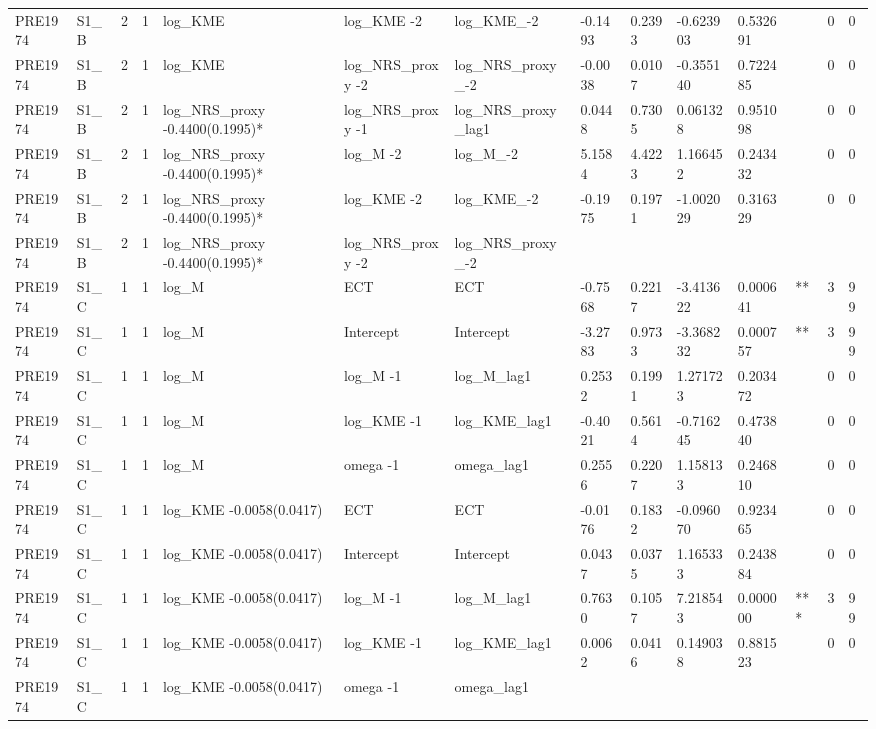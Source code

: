 \begin{tabular}{llllllllllllll}
PRE1974 & S1\_B & 2 & 1 & log\_KME & log\_KME -2 & log\_KME\_-2 & -0.1493 & 0.2393 & -0.623903 & 0.532691 &  & 0 & 0 \\
PRE1974 & S1\_B & 2 & 1 & log\_KME & log\_NRS\_proxy -2 & log\_NRS\_proxy\_-2 & -0.0038 & 0.0107 & -0.355140 & 0.722485 &  & 0 & 0 \\
PRE1974 & S1\_B & 2 & 1 & log\_NRS\_proxy -0.4400(0.1995)* & log\_NRS\_proxy -1 & log\_NRS\_proxy\_lag1 & 0.0448 & 0.7305 & 0.061328 & 0.951098 &  & 0 & 0 \\
PRE1974 & S1\_B & 2 & 1 & log\_NRS\_proxy -0.4400(0.1995)* & log\_M -2 & log\_M\_-2 & 5.1584 & 4.4223 & 1.166452 & 0.243432 &  & 0 & 0 \\
PRE1974 & S1\_B & 2 & 1 & log\_NRS\_proxy -0.4400(0.1995)* & log\_KME -2 & log\_KME\_-2 & -0.1975 & 0.1971 & -1.002029 & 0.316329 &  & 0 & 0 \\
PRE1974 & S1\_B & 2 & 1 & log\_NRS\_proxy -0.4400(0.1995)* & log\_NRS\_proxy -2 & log\_NRS\_proxy\_-2 &  &  &  &  &  &  &  \\
PRE1974 & S1\_C & 1 & 1 & log\_M & ECT & ECT & -0.7568 & 0.2217 & -3.413622 & 0.000641 & ** & 3 & 99 \\
PRE1974 & S1\_C & 1 & 1 & log\_M & Intercept & Intercept & -3.2783 & 0.9733 & -3.368232 & 0.000757 & ** & 3 & 99 \\
PRE1974 & S1\_C & 1 & 1 & log\_M & log\_M -1 & log\_M\_lag1 & 0.2532 & 0.1991 & 1.271723 & 0.203472 &  & 0 & 0 \\
PRE1974 & S1\_C & 1 & 1 & log\_M & log\_KME -1 & log\_KME\_lag1 & -0.4021 & 0.5614 & -0.716245 & 0.473840 &  & 0 & 0 \\
PRE1974 & S1\_C & 1 & 1 & log\_M & omega -1 & omega\_lag1 & 0.2556 & 0.2207 & 1.158133 & 0.246810 &  & 0 & 0 \\
PRE1974 & S1\_C & 1 & 1 & log\_KME -0.0058(0.0417) & ECT & ECT & -0.0176 & 0.1832 & -0.096070 & 0.923465 &  & 0 & 0 \\
PRE1974 & S1\_C & 1 & 1 & log\_KME -0.0058(0.0417) & Intercept & Intercept & 0.0437 & 0.0375 & 1.165333 & 0.243884 &  & 0 & 0 \\
PRE1974 & S1\_C & 1 & 1 & log\_KME -0.0058(0.0417) & log\_M -1 & log\_M\_lag1 & 0.7630 & 0.1057 & 7.218543 & 0.000000 & *** & 3 & 99 \\
PRE1974 & S1\_C & 1 & 1 & log\_KME -0.0058(0.0417) & log\_KME -1 & log\_KME\_lag1 & 0.0062 & 0.0416 & 0.149038 & 0.881523 &  & 0 & 0 \\
PRE1974 & S1\_C & 1 & 1 & log\_KME -0.0058(0.0417) & omega -1 & omega\_lag1 &  &  &  &  &  &  &  \\

\end{tabular}
